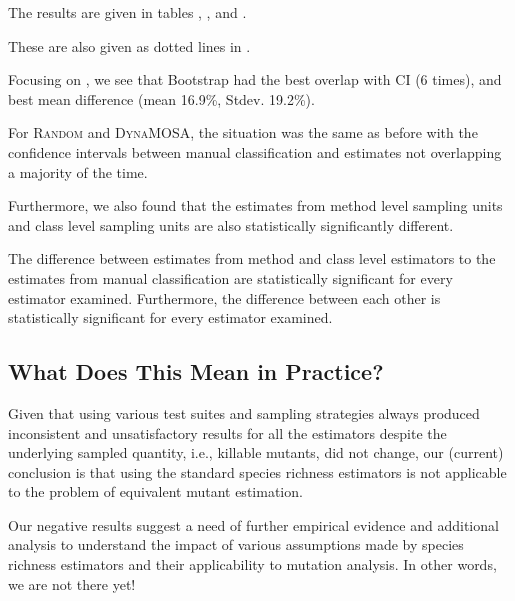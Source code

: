 \documentclass[sigconf,review,anonymous]{acmart}
\newcommand{\EvosuiteRandom}{\textsc{Random}\xspace}
\newcommand{\EvosuiteDynamosa}{\textsc{DynaMOSA}\xspace}
\begin{document}
The results are given in tables ,
, and .

These are also given as dotted lines in .

Focusing on , we see that Bootstrap had the best
overlap with CI (6 times), and best mean difference (mean 16.9\%, Stdev. 19.2\%).

For \EvosuiteRandom and \EvosuiteDynamosa, the situation was the same as before
with the confidence intervals between manual classification and estimates not
overlapping a majority of the time.

Furthermore, we also found that the estimates from method level sampling units
and class level sampling units are also statistically significantly different.

\begin{tcolorbox}[boxrule=0.5pt, arc=4pt, boxsep=0pt, width=\columnwidth]
The difference between estimates from method and class level
estimators to the estimates from manual classification are statistically
significant for every estimator examined. Furthermore, the difference between
each other is statistically significant for every estimator examined.
\end{tcolorbox}

\subsection{What Does This Mean in Practice?}

Given that using various test suites and sampling strategies always produced inconsistent and
unsatisfactory results for all the estimators despite the underlying sampled quantity, i.e., killable
mutants, did not change, our (current) conclusion is that using the standard species richness estimators
is not applicable to the problem of equivalent mutant estimation.

Our negative results
suggest a need of further empirical evidence and additional analysis
to understand the impact of various assumptions made by species richness estimators
and their applicability to mutation analysis.
%
In other words, we are not there yet!

\end{document}
